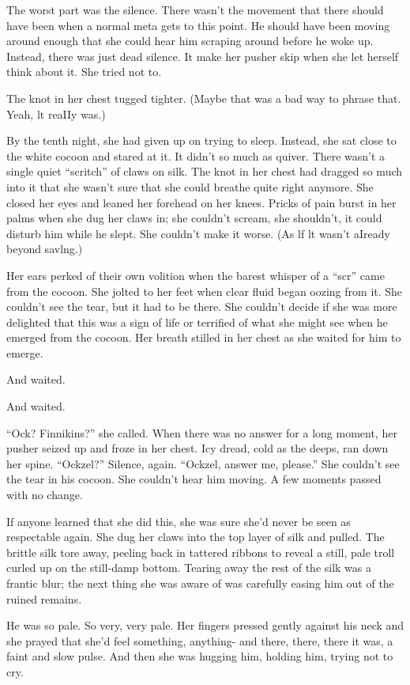 \documentclass[a1paper]{article}
\begin{document}
\begin{multicols}{7}
{The worst part was the silence.  There wasn't the movement that there should have been when a normal meta gets to this point.  He should have been moving around enough that she could hear him scraping around before he woke up.  Instead, there was just dead silence.  It make her pusher skip when she let herself think about it.  She tried not to.

The knot in her chest tugged tighter.  (Maybe that was a bad way to phrase that.  Yeah, lt reaIIy was.)

By the tenth night, she had given up on trying to sleep.  Instead, she sat close to the white cocoon and stared at it.  It didn't so much as quiver.  There wasn't a single quiet “scritch” of claws on silk.  The knot in her chest had dragged so much into it that she wasn't sure that she could breathe quite right anymore.  She closed her eyes and leaned her forehead on her knees.  Pricks of pain burst in her palms when she dug her claws in; she couldn't scream, she shouldn't, it could disturb him while he slept.  She couldn't make it worse.  (As lf lt wasn't aIready beyond savlng.)

Her ears perked of their own volition when the barest whisper of a “scr” came from the cocoon.  She jolted to her feet when clear fluid began oozing from it.  She couldn't see the tear, but it had to be there.  She couldn't decide if she was more delighted that this was a sign of life or terrified of what she might see when he emerged from the cocoon.  Her breath stilled in her chest as she waited for him to emerge.

And waited.

And waited.

“Ock?  Finnikins?” she called.  When there was no answer for a long moment, her pusher seized up and froze in her chest.  Icy dread, cold as the deeps, ran down her spine.  “Ockzel?”  Silence, again.  “Ockzel, answer me, please.”  She couldn't see the tear in his cocoon.  She couldn't hear him moving.  A few moments passed with no change.

If anyone learned that she did this, she was sure she'd never be seen as respectable again.  She dug her claws into the top layer of silk and pulled.  The brittle silk tore away, peeling back in tattered ribbons to reveal a still, pale troll curled up on the still-damp bottom.  Tearing away the rest of the silk was a frantic blur; the next thing she was aware of was carefully easing him out of the ruined remains.

He was so pale.  So very, very pale.  Her fingers pressed gently against his neck and she prayed that she'd feel something, anything- and there, there, there it was, a faint and slow pulse.  And then she was hugging him, holding him, trying not to cry.

}
\end{multicols}
\end{document}
